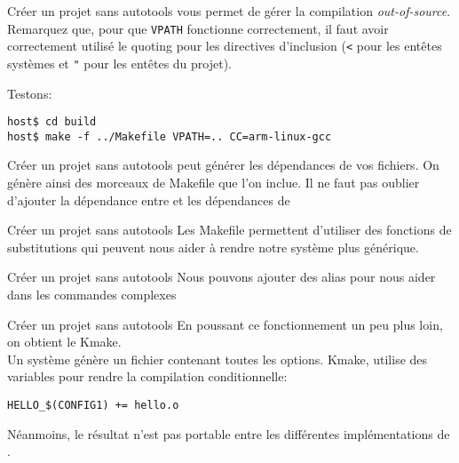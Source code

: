 \begin{frame}[fragile=singleslide]{Créer un projet sans autotools}
   vous permet de gérer la compilation \emph{out-of-source}.
  Remarquez que, pour que \verb+VPATH+ fonctionne correctement, il faut avoir
  correctement utilisé le quoting pour les directives d'inclusion (\verb+<+ pour
  les entêtes systèmes et \verb+"+ pour les entêtes du projet).
  
  Testons: 
\begin{lstlisting}
host$ cd build
host$ make -f ../Makefile VPATH=.. CC=arm-linux-gcc
\end{lstlisting} %
\end{frame}

\begin{frame}[fragile=singleslide]{Créer un projet sans autotools}
   peut  générer les dépendances de vos  fichiers.  On génère
  ainsi  des morceaux  de Makefile  que l'on  inclue. Il  ne  faut pas
  oublier   d'ajouter  la  dépendance   entre     et  les
  dépendances de 
  
\end{frame}

\begin{frame}[fragile=singleslide]{Créer un projet sans autotools}
  Les  Makefile permettent d'utiliser  des fonctions  de substitutions
  qui  peuvent  nous aider  à  rendre  notre  système plus  générique.
  
\end{frame}

\begin{frame}[fragile=singleslide]{Créer un projet sans autotools}
  Nous pouvons  ajouter des alias  pour nous aider dans  les commandes
  complexes
  
\end{frame}


\begin{frame}[fragile=singleslide]{Créer un projet sans autotools}
  En poussant ce fonctionnement un peu plus loin, on obtient le Kmake.\\
  Un système  génère un fichier contenant toutes  les options.  Kmake,
  utilise des variables pour rendre la compilation conditionnelle:
\begin{lstlisting}
HELLO_$(CONFIG1) += hello.o
\end{lstlisting}
  Néanmoins,  le résultat  n'est  pas portable  entre les  différentes
  implémentations de .
\end{frame}

